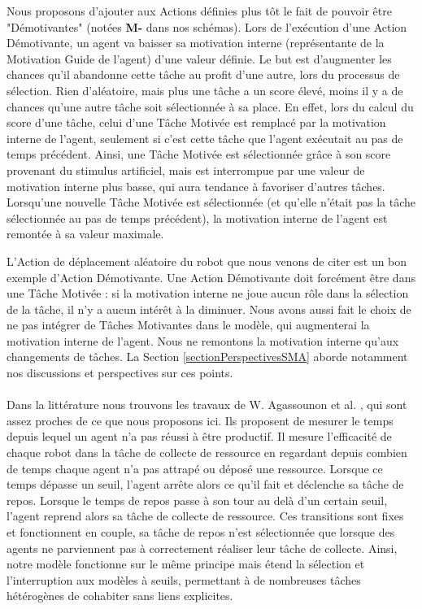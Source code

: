 			Nous proposons d'ajouter aux Actions définies plus tôt le fait de pouvoir être "Démotivantes" (notées \textbf{M-} dans nos schémas). Lors de l'exécution d'une Action Démotivante, un agent va baisser sa motivation interne (représentante de la Motivation Guide de l'agent) d'une valeur définie. Le but est d'augmenter les chances qu'il abandonne cette tâche au profit d'une autre, lors du processus de sélection. Rien d'aléatoire, mais plus une tâche a un score élevé, moins il y a de chances qu'une autre tâche soit sélectionnée à sa place. En effet, lors du calcul du score d'une tâche, celui d'une Tâche Motivée est remplacé par la motivation interne de l'agent, seulement si c'est cette tâche que l'agent exécutait au pas de temps précédent. Ainsi, une Tâche Motivée est sélectionnée grâce à son score provenant du stimulus artificiel, mais est interrompue par une valeur de motivation interne plus basse, qui aura tendance à favoriser d'autres tâches. Lorsqu'une nouvelle Tâche Motivée est sélectionnée (et qu'elle n'était pas la tâche sélectionnée au pas de temps précédent), la motivation interne de l'agent est remontée à sa valeur maximale.
			
			L'Action de déplacement aléatoire du robot que nous venons de citer est un bon exemple d'Action Démotivante. Une Action Démotivante doit forcément être dans une Tâche Motivée : si la motivation interne ne joue aucun rôle dans la sélection de la tâche, il n'y a aucun intérêt à la diminuer. Nous avons aussi fait le choix de ne pas intégrer de Tâches Motivantes dans le modèle, qui augmenterai la motivation interne de l'agent. Nous ne remontons la motivation interne qu'aux changements de tâches. La Section \ref{sectionPerspectivesSMA} aborde notamment nos discussions et perspectives sur ces points.
			
			
			\paragraph{}			
			Dans la littérature nous trouvons les travaux de W. Agassounon et al. \cite{agassounon_scalable_2001}, qui sont assez proches de ce que nous proposons ici. Ils proposent de mesurer le temps depuis lequel un agent n'a pas réussi à être productif. Il mesure l'efficacité de chaque robot dans la tâche de collecte de ressource en regardant depuis combien de temps chaque agent n'a pas attrapé ou déposé une ressource. Lorsque ce temps dépasse un seuil, l'agent arrête alors ce qu'il fait et déclenche sa tâche de repos. Lorsque le temps de repos passe à son tour au delà d'un certain seuil, l'agent reprend alors sa tâche de collecte de ressource. Ces transitions sont fixes et fonctionnent en couple, sa tâche de repos n'est sélectionnée que lorsque des agents ne parviennent pas à correctement réaliser leur tâche de collecte. Ainsi, notre modèle fonctionne sur le même principe mais étend la sélection et l'interruption aux modèles à seuils, permettant à de nombreuses tâches hétérogènes de cohabiter sans liens explicites.
			
